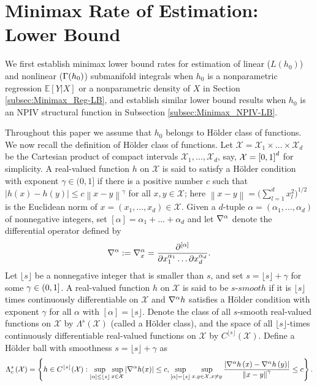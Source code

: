 \documentclass[12pt,american]{article}
\theoremstyle{definition}
\theoremstyle{plain}
\theoremstyle{definition}
\theoremstyle{plain}
\theoremstyle{plain}
\theoremstyle{plain}
\theoremstyle{plain}
\theoremstyle{plain}
\newcommand{\E}{\mathbb{E}}
\newcommand{\norm}[1]{\left\| #1 \right\|}
\begin{document}
\section{\label{sec:Minimax-LB}Minimax Rate of Estimation: Lower Bound}

We first establish minimax lower bound rates for estimation of linear ($L(h_0)$) and nonlinear ($\Gamma(h_0)$) submanifold integrals when $h_0$ is a nonparametric regression $\E[Y|X]$ or a nonparametric density of $X$ in Section \ref{subsec:Minimax_Reg-LB}, and establish similar lower bound results when $h_0$ is an NPIV structural function in Subsection \ref{subsec:Minimax_NPIV-LB}.

Throughout this paper we assume that $h_0$ belongs to H\"{o}lder class of functions. We now recall the definition of H\"{o}lder class of functions. Let $\mathcal{X}=\mathcal{X}_{1}\times...\times\mathcal{X}_{d}$
be the Cartesian product of compact intervals $\mathcal{X}_{1},\dots,\mathcal{X}_{d}$,
say, ${\cal X}=\left[0,1\right]^{d}$ for simplicity. A real-valued
function $h$ on $\mathcal{X}$ is said to satisfy a H\"{o}lder  condition
with exponent $\gamma\in(0,1]$ if there is a positive number $c$
such that $\left|h(x)-h(y)\right|\leq c\norm{x-y}^{\gamma}$ for all
$x,y\in\mathcal{X}$; here $\norm{x-y}=\bigl(\sum_{l=1}^{d}x_{l}^{2}\bigr)^{1/2}$
is the Euclidean norm of $x=\left(x_{1},\dots,x_{d}\right)\in\mathcal{X}$.
Given a $d$-tuple $\alpha=\left(\alpha_{1},\dots,\alpha_{d}\right)$
of nonnegative integers, set $\left[\alpha\right]=\alpha_{1}+\dots+\alpha_{d}$
and let $\nabla^{\alpha}$ denote the differential operator defined by
\[
  \nabla^{\alpha}:=\nabla_x^{\alpha}=\frac{\partial^{\left[\alpha\right]}}{\partial x_{1}^{\alpha_{1}}\dots\partial x_{d}^{\alpha_{d}}}.
\]
Let $\lfloor s\rfloor$ be a nonnegative integer that is smaller than
$s$, and set $s=\lfloor s\rfloor+\gamma$ for some $\gamma\in(0,1]$.
A real-valued function $h$ on $\mathcal{X}$ is said to be $s$-$smooth$
if it is $\lfloor s\rfloor$ times continuously differentiable on
$\mathcal{X}$ and $\nabla^{\alpha}h$ satisfies a H\"{o}lder  condition with
exponent $\gamma$ for all $\alpha$ with $\left[\alpha\right]=\lfloor s\rfloor$.
Denote the class of all $s$-smooth real-valued functions on $\mathcal{X}$
by $\Lambda^{s}(\mathcal{X})$ (called a H\"{o}lder  class), and the space
of all $\lfloor s\rfloor$-times continuously differentiable real-valued
functions on $\mathcal{X}$ by $C^{\lfloor s\rfloor}(\mathcal{X})$.
Define a H\"{o}lder ball with smoothness $s=\lfloor s\rfloor+\gamma$
as
\[
  \Lambda_{c}^{s}\left(\mathcal{X}\right)=\left\{ h\in C^{\lfloor s\rfloor}(\mathcal{X}):\sup_{[\alpha]\leq\lfloor s\rfloor}\sup_{x\in\mathcal{X}}\left|\Dif^{\alpha}h(x)\right|\leq c,\sup_{[\alpha]=\lfloor s\rfloor}\sup_{x,y\in\mathcal{X},x\neq y}\frac{\left|\Dif^{\alpha}h\left(x\right)-\Dif^{\alpha}h\left(y\right)\right|}{\norm{x-y}^{\gamma}}\leq c\right\} .
\]
\end{document}
